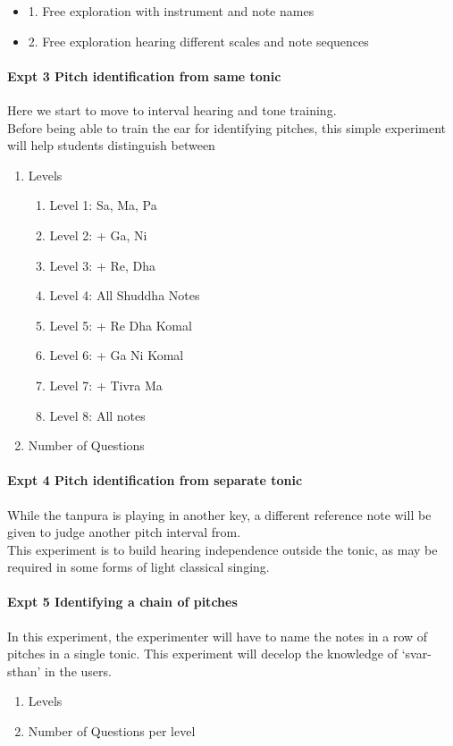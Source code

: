 \documentclass{tufte-handout}
\begin{document}
\begin{itemize}
\item 1. Free exploration with instrument and note names

\item 2. Free exploration hearing different scales and note sequences\\
\end{itemize} %

\paragraph{Expt 3 Pitch identification from same tonic}

Here we start to move to interval hearing and tone training. \\
Before being able to train the ear for identifying pitches, this
simple experiment will help students distinguish between 

\begin{enumerate}
\item Levels
\begin{enumerate}
\item Level 1: Sa, Ma, Pa
\item Level 2: + Ga, Ni
\item Level 3: + Re, Dha
\item Level 4: All Shuddha Notes
\item Level 5: + Re Dha Komal
\item Level 6: + Ga Ni Komal
\item Level 7: + Tivra Ma
\item Level 8: All notes
\end{enumerate}
\item Number of Questions
\end{enumerate}

\paragraph{Expt 4 Pitch identification from separate tonic}
While the tanpura is playing in another key, a different reference
note will be given to judge another pitch interval from.\\
This experiment is to build hearing independence outside the tonic, as may be required in some forms of light classical singing.
\paragraph{Expt 5 Identifying a chain of pitches}
In this experiment, the experimenter will have to name the notes in a row of pitches in a single tonic. This experiment will decelop the knowledge of `svar-sthan' in the users.
\begin{enumerate}
\item Levels
\item Number of Questions per level
\end{enumerate}
     
\end{document}
